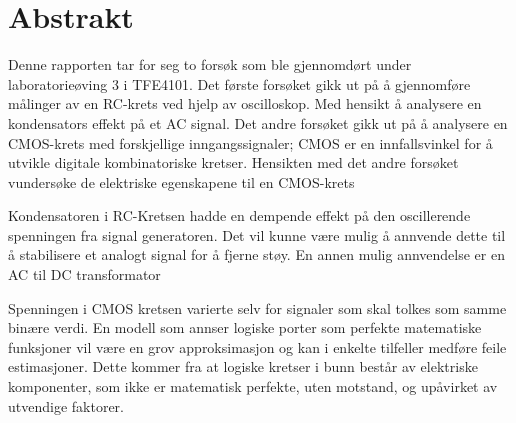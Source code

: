 \section{Abstrakt}

    Denne rapporten tar for seg to forsøk  som ble gjennomdørt under laboratorieøving 3 i TFE4101. Det første forsøket gikk ut på å gjennomføre målinger av en RC-krets ved hjelp av oscilloskop.
    Med hensikt å analysere en kondensators effekt på et AC signal.
    Det andre forsøket gikk ut på å analysere en CMOS-krets med forskjellige inngangssignaler;
    CMOS er en innfallsvinkel for å utvikle digitale kombinatoriske kretser. Hensikten med det andre forsøket vundersøke de elektriske egenskapene til en CMOS-krets

    Kondensatoren i RC-Kretsen hadde en dempende effekt på den oscillerende spenningen fra signal generatoren. Det vil kunne være mulig å annvende dette til å stabilisere et analogt signal for å fjerne støy. En annen mulig annvendelse er en AC til DC transformator

    Spenningen i CMOS kretsen varierte selv for signaler som skal tolkes som samme binære verdi. En modell som annser logiske porter som perfekte matematiske funksjoner vil være en grov approksimasjon og kan i enkelte tilfeller medføre feile estimasjoner. Dette kommer fra at logiske kretser i bunn består av elektriske komponenter, som ikke er matematisk perfekte, uten motstand, og upåvirket av utvendige faktorer. 